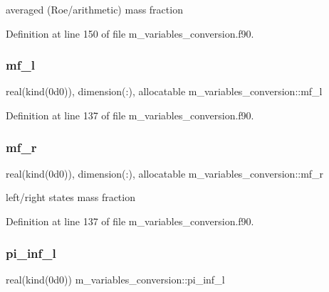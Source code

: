 averaged (Roe/arithmetic) mass fraction 



Definition at line 150 of file m\+\_\+variables\+\_\+conversion.\+f90.

\mbox{\label{namespacem__variables__conversion_a0f5485ff839ecbf46ff48d6dc74c0d90}} 
\subsubsection{\texorpdfstring{mf\+\_\+l}{mf\_l}}
{\footnotesize\ttfamily real(kind(0d0)), dimension(\+:), allocatable m\+\_\+variables\+\_\+conversion\+::mf\+\_\+l}



Definition at line 137 of file m\+\_\+variables\+\_\+conversion.\+f90.

\mbox{\label{namespacem__variables__conversion_ae846c6fc6552d5bfe98e1e6ad69d1097}} 
\subsubsection{\texorpdfstring{mf\+\_\+r}{mf\_r}}
{\footnotesize\ttfamily real(kind(0d0)), dimension(\+:), allocatable m\+\_\+variables\+\_\+conversion\+::mf\+\_\+r}



left/right states mass fraction 



Definition at line 137 of file m\+\_\+variables\+\_\+conversion.\+f90.

\mbox{\label{namespacem__variables__conversion_a6f2d4a77c301f98562a27a23b2983691}} 
\subsubsection{\texorpdfstring{pi\+\_\+inf\+\_\+l}{pi\_inf\_l}}
{\footnotesize\ttfamily real(kind(0d0)) m\+\_\+variables\+\_\+conversion\+::pi\+\_\+inf\+\_\+l}



